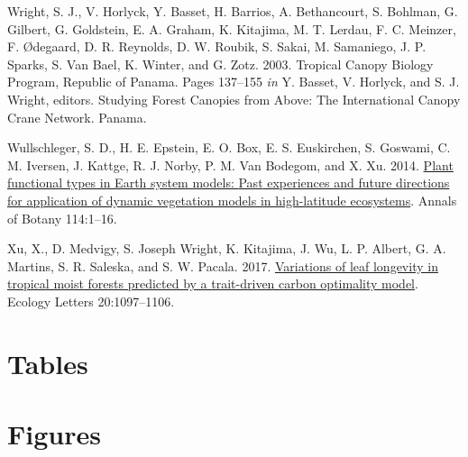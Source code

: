 \documentclass[
  12pt,
  a4paper,
,tablecaptionabove
]{scrartcl}
\newlength{\cslhangindent}
\newenvironment{CSLReferences}[2] %
 {%
  \setlength{\parindent}{0pt}
  \ifodd #1 \everypar{\setlength{\hangindent}{\cslhangindent}}\ignorespaces\fi
  \ifnum #2 > 0
  \setlength{\parskip}{#2\baselineskip}
  \fi
 }%
 {}
\begin{document}
\begin{CSLReferences}{1}{0}
\leavevmode{}%
Wright, S. J., V. Horlyck, Y. Basset, H. Barrios, A. Bethancourt, S. Bohlman, G. Gilbert, G. Goldstein, E. A. Graham, K. Kitajima, M. T. Lerdau, F. C. Meinzer, F. Ødegaard, D. R. Reynolds, D. W. Roubik, S. Sakai, M. Samaniego, J. P. Sparks, S. Van Bael, K. Winter, and G. Zotz. 2003. Tropical {Canopy Biology Program}, {Republic} of {Panama}. Pages 137--155 \emph{in} Y. Basset, V. Horlyck, and S. J. Wright, editors. Studying {Forest Canopies} from {Above}: {The International Canopy Crane Network}. {Panama}.

\leavevmode{}%
Wullschleger, S. D., H. E. Epstein, E. O. Box, E. S. Euskirchen, S. Goswami, C. M. Iversen, J. Kattge, R. J. Norby, P. M. Van Bodegom, and X. Xu. 2014. \href{https://doi.org/10.1093/aob/mcu077}{Plant functional types in {Earth} system models: {Past} experiences and future directions for application of dynamic vegetation models in high-latitude ecosystems}. Annals of Botany 114:1--16.

\leavevmode{}%
Xu, X., D. Medvigy, S. Joseph Wright, K. Kitajima, J. Wu, L. P. Albert, G. A. Martins, S. R. Saleska, and S. W. Pacala. 2017. \href{https://doi.org/10.1111/ele.12804}{Variations of leaf longevity in tropical moist forests predicted by a trait-driven carbon optimality model}. Ecology Letters 20:1097--1106.

\end{CSLReferences}

\newpage

\hypertarget{tables}{%
\section{Tables}\label{tables}}

\newpage

\hypertarget{figures}{%
\section{Figures}\label{figures}}
\end{document}
